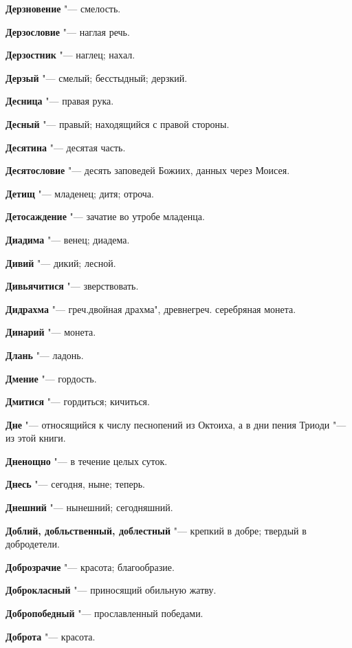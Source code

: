 \begin{mymulticols}
\noindent\textbf{Дерзновение} "--- смелость. 

\noindent\textbf{Дерзословие} "--- наглая речь. 

\noindent\textbf{Дерзостник} "--- наглец; нахал. 

\noindent\textbf{Дерзый} "--- смелый; бесстыдный; дерзкий. 

\noindent\textbf{Десница} "--- правая рука. 

\noindent\textbf{Десный} "--- правый; находящийся с правой стороны. 

\noindent\textbf{Десятина} "--- десятая часть. 

\noindent\textbf{Десятословие} "--- десять заповедей Божиих, данных через Моисея. 

\noindent\textbf{Детищ} "--- младенец; дитя; отроча. 

\noindent\textbf{Детосаждение} "--- зачатие во утробе младенца. 

\noindent\textbf{Диадима} "--- венец; диадема. 

\noindent\textbf{Дивий} "--- дикий; лесной. 

\noindent\textbf{Дивьячитися} "--- зверствовать. 

\noindent\textbf{Дидрахма} "--- греч.двойная драхма", древнегреч. серебряная монета. 

\noindent\textbf{Динарий} "--- монета. 

\noindent\textbf{Длань} "--- ладонь. 

\noindent\textbf{Дмение} "--- гордость. 

\noindent\textbf{Дмитися} "--- гордиться; кичиться. 

\noindent\textbf{Дне} "--- относящийся к числу песнопений из Октоиха, а в дни пения Триоди "--- из этой книги. 

\noindent\textbf{Дненощно} "--- в течение целых суток. 

\noindent\textbf{Днесь} "--- сегодня, ныне; теперь. 

\noindent\textbf{Днешний} "--- нынешний; сегодняшний. 

\noindent\textbf{Доблий, добльственный, доблестный} "--- крепкий в добре; твердый в добродетели. 

\noindent\textbf{Доброзрачие} "--- красота; благообразие. 

\noindent\textbf{Доброкласный} "--- приносящий обильную жатву. 

\noindent\textbf{Добропобедный} "--- прославленный победами. 

\noindent\textbf{Доброта} "--- красота. 


\end{mymulticols}
